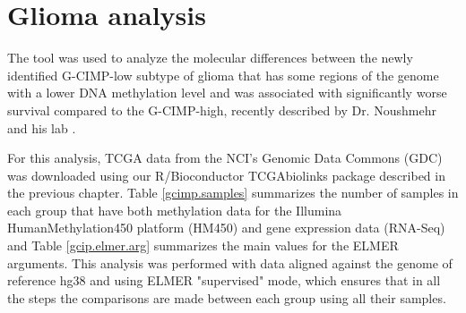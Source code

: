 


\section{Glioma analysis} \label{sec:glioma_analysis}

The 
tool was used to analyze the molecular differences between the newly
identified G-CIMP-low subtype of glioma that has some regions of the genome with a lower
DNA methylation level and was associated with significantly
worse survival compared to the G-CIMP-high, recently described by Dr. Noushmehr
and his lab \cite{ceccarelli2016molecular}.

For this analysis, TCGA data from the NCI's Genomic Data Commons (GDC) was
downloaded using our R/Bioconductor TCGAbiolinks package described in the previous chapter.
Table \ref{gcimp.samples} summarizes the number of samples in each group that have both 
methylation data for the Illumina HumanMethylation450 platform (HM450) and gene expression data
(RNA-Seq) and Table \ref{gcip.elmer.arg} summarizes the main values for the ELMER arguments.
This analysis was performed with data aligned against the genome of reference hg38 and
using ELMER "supervised" mode, which ensures that in all the steps the
comparisons are made between each group using all their samples.

